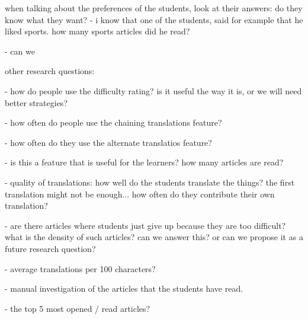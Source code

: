 
when talking about the preferences of the students, 
look at their answers: do they know what they want? 
- i know that one of the students, said for example
that he liked sports. how many sports articles did
he read? 

- can we 


other research questions: 

- how do people use the difficulty rating? is it useful
the way it is, or we will need better strategies? 

- how often do people use the chaining translations feature? 

- how often do they use the alternate translatios feature? 

- is this a feature that is useful for the learners? 
how many articles are read? 

- quality of translations: how well do the students translate the things? the first translation might not be enough... how often do they contribute
their own translation? 

- are there articles where students just give up because 
they are too difficult? what is the density of such articles? 
can we answer this? or can we propose it as a future research 
question? 

- average translations per 100 characters? 

- manual investigation of the articles that the students have read.

- the top 5 most opened / read articles? 






